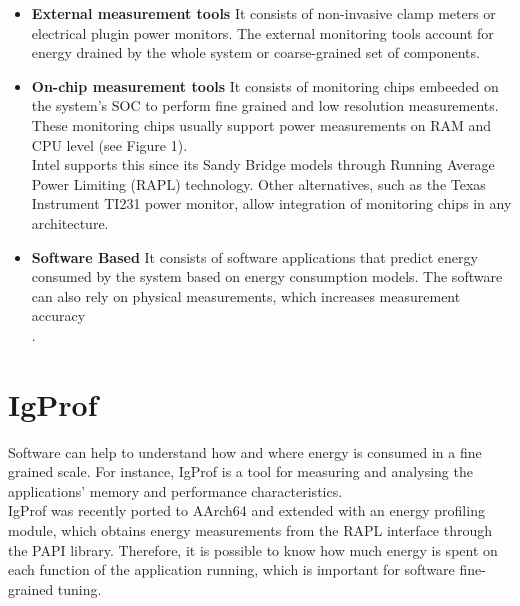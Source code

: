 \documentclass[portrait,a1,final]{a0poster} %
\begin{document}
\begin{minipage}[tc]{0.9\linewidth}
\begin{minipage}[t]{0.5\linewidth}
\begin{minipage}[b]{1\linewidth}
\begin{itemize}
\item \textbf{External measurement tools}
It consists of non-invasive clamp meters or electrical plugin power monitors. The external monitoring tools account for energy drained by the whole system or coarse-grained set of components.
\item \textbf{On-chip measurement tools}
It consists of monitoring chips embeeded on the system's SOC to perform fine grained and low resolution measurements.\\
These monitoring chips usually support power measurements on RAM and CPU level (see Figure 1).\\
Intel supports this since its Sandy Bridge models through Running Average Power Limiting (RAPL) technology. Other alternatives, such as the Texas Instrument TI231 power monitor, allow integration of monitoring chips in any architecture. 
\item \textbf{Software Based}
It consists of software applications that predict energy consumed by the system based on energy consumption models. The software can also rely on physical measurements, which increases measurement accuracy\\.
\end{itemize}
\end{minipage}

\section{IgProf}

Software can help to understand how and where energy is consumed in a fine grained scale. For instance, IgProf is a tool for measuring and analysing the applications' memory and performance characteristics.\\ 
IgProf was recently ported to AArch64 and extended with an energy profiling module, which obtains energy measurements from the RAPL interface through the PAPI library. Therefore, it is possible to know how much energy is spent on each function of the application running, which is important for software fine-grained tuning.



\end{minipage} %
\hspace{0.03\linewidth} %
\begin{minipage}[t]{0.5\linewidth}
\setlength{\parindent}{10mm} %


\end{minipage}
\end{minipage}
\end{document}
